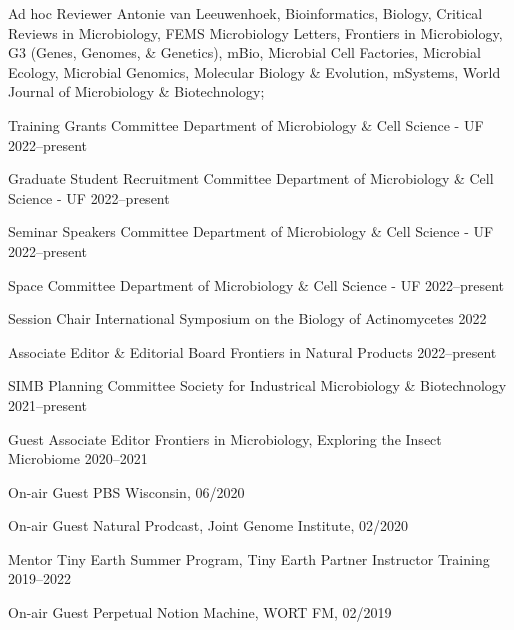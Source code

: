 

\begin{cvhonors}

\cvhonor
{Ad hoc Reviewer}
{Antonie van Leeuwenhoek, Bioinformatics, Biology, Critical Reviews in Microbiology, FEMS Microbiology Letters, Frontiers in Microbiology, G3 (Genes, Genomes, \& Genetics), mBio, Microbial Cell Factories, Microbial Ecology, Microbial Genomics, Molecular Biology \& Evolution, mSystems, World Journal of Microbiology \& Biotechnology; \textbf{\textit{}}}
{}

\cvhonor
{Training Grants Committee}
{Department of Microbiology \& Cell Science - UF}
{2022--present}

\cvhonor
{Graduate Student Recruitment Committee}
{Department of Microbiology \& Cell Science - UF}
{2022--present}

\cvhonor
{Seminar Speakers Committee}
{Department of Microbiology \& Cell Science - UF}
{2022--present}

\cvhonor
{Space Committee}
{Department of Microbiology \& Cell Science - UF}
{2022--present}

\cvhonor
{Session Chair}
{International Symposium on the Biology of Actinomycetes}
{2022}

\cvhonor
{Associate Editor \& Editorial Board}
{Frontiers in Natural Products}
{2022--present}

\cvhonor
{SIMB Planning Committee}
{Society for Industrical Microbiology \& Biotechnology}
{2021--present}

\end{cvhonors} \begin{cvhonors}

\cvhonor
{Guest Associate Editor}
{Frontiers in Microbiology, Exploring the Insect Microbiome}
{2020--2021}

\cvhonor
{On-air Guest}
{PBS Wisconsin, \textbf{\textit{}}}
{06/2020}

\cvhonor
{On-air Guest}
{Natural Prodcast, Joint Genome Institute, \textbf{\textit{}}}
{02/2020}

\cvhonor
{Mentor}
{Tiny Earth Summer Program, Tiny Earth Partner Instructor Training}
{2019--2022}

\cvhonor
{On-air Guest}
{Perpetual Notion Machine, WORT FM, \textbf{\textit{}}}
{02/2019}


\end{cvhonors}
